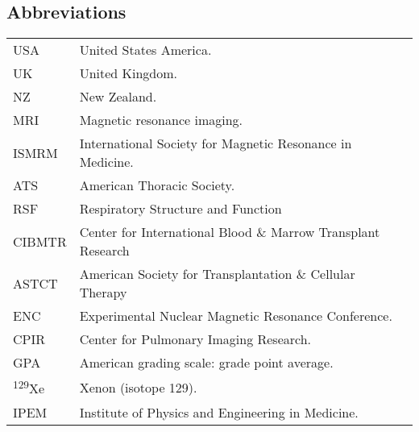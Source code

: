 \documentclass[12pt,]{scrartcl}
\begin{document}
\subsection{Abbreviations}\label{abbreviations}
\begin{table}[h!]
{\def\arraystretch{1.5}\tabcolsep=0pt
\begin{tabular}{p{0.15\linewidth}p{0.85\linewidth}}

  USA & United States America. \\
  UK & United Kingdom. \\
  NZ & New Zealand. \\
  MRI & Magnetic resonance imaging. \\
  ISMRM & International Society for Magnetic Resonance in Medicine. \\
  ATS & American Thoracic Society.  \\
  RSF & Respiratory Structure and Function \\
  CIBMTR & Center for International Blood \& Marrow Transplant Research \\
  ASTCT & American Society for Transplantation \& Cellular Therapy \\
  ENC & Experimental Nuclear Magnetic Resonance Conference. \\
  CPIR & Center for Pulmonary Imaging Research. \\
  GPA & American grading scale: grade point average. \\
  \textsuperscript{129}Xe & Xenon (isotope 129).  \\
  IPEM & Institute of Physics and Engineering in Medicine. \\
\end{tabular}%
}
\end{table}
\end{document}
